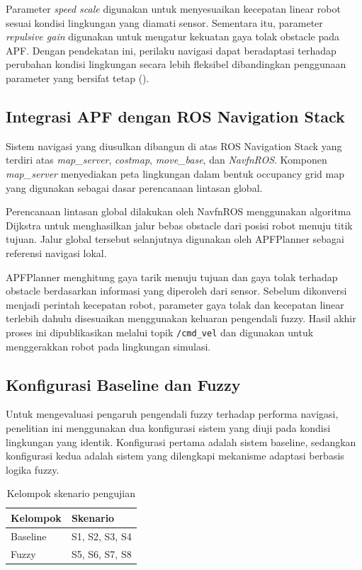 Parameter \textit{speed scale} digunakan untuk menyesuaikan kecepatan linear robot sesuai kondisi lingkungan yang diamati sensor. Sementara itu, parameter \textit{repulsive gain} digunakan untuk mengatur kekuatan gaya tolak obstacle pada APF. Dengan pendekatan ini, perilaku navigasi dapat beradaptasi terhadap perubahan kondisi lingkungan secara lebih fleksibel dibandingkan penggunaan parameter yang bersifat tetap (\cite{Haider2022,Benaicha2026}).

\subsection{Integrasi APF dengan ROS Navigation Stack}

Sistem navigasi yang diusulkan dibangun di atas ROS Navigation Stack yang terdiri atas \textit{map\_server}, \textit{costmap}, \textit{move\_base}, dan \textit{NavfnROS}. Komponen \textit{map\_server} menyediakan peta lingkungan dalam bentuk occupancy grid map yang digunakan sebagai dasar perencanaan lintasan global.

Perencanaan lintasan global dilakukan oleh NavfnROS menggunakan algoritma Dijkstra untuk menghasilkan jalur bebas obstacle dari posisi robot menuju titik tujuan. Jalur global tersebut selanjutnya digunakan oleh APFPlanner sebagai referensi navigasi lokal.

APFPlanner menghitung gaya tarik menuju tujuan dan gaya tolak terhadap obstacle berd\-asarkan informasi yang diperoleh dari sensor. Sebelum dikonversi menjadi perintah kecepatan robot, parameter gaya tolak dan kecepatan linear terlebih dahulu disesuaikan menggunakan keluaran pengendali fuzzy. Hasil akhir proses ini dipublikasikan melalui topik \texttt{/cmd\_vel} dan digunakan untuk menggerakkan robot pada lingkungan simulasi.

\subsection{Konfigurasi Baseline dan Fuzzy}

Untuk mengevaluasi pengaruh pengendali fuzzy terhadap performa navigasi, penelitian ini menggunakan dua konfigurasi sistem yang diuji pada kondisi lingkungan yang identik. Konfigurasi pertama adalah sistem baseline, sedangkan konfigurasi kedua adalah sistem yang dilengkapi mekanisme adaptasi berbasis logika fuzzy.

\begin{table}[H]
\centering
\caption{Kelompok skenario pengujian}
\label{tab:kelompok_skenario}
\begin{tabular}{ll}
\toprule
Kelompok & Skenario \\
\midrule
Baseline & S1, S2, S3, S4 \\
Fuzzy & S5, S6, S7, S8 \\
\bottomrule
\end{tabular}
\end{table}

